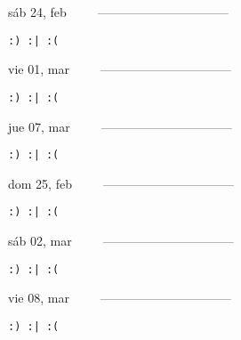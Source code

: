 \documentclass[letterpaper,10pt]{article}
\begin{document}
\begin{multicols}{3}
{sáb 24, feb\ \ \ \ \ --------------------------------}
\begin{flushright}\begin{small}\texttt{:) :| :(}\end{small}\end{flushright}
\vfill
{vie 01, mar\ \ \ \ \ --------------------------------}
\begin{flushright}\begin{small}\texttt{:) :| :(}\end{small}\end{flushright}\par
\vfill
{jue 07, mar\ \ \ \ \ --------------------------------}
\begin{flushright}\begin{small}\texttt{:) :| :(}\end{small}\end{flushright}\par
\vfill
\end{multicols}
\vspace{1.05cm}

\begin{multicols}{3}
{dom 25, feb\ \ \ \ \ --------------------------------}
\begin{flushright}\begin{small}\texttt{:) :| :(}\end{small}\end{flushright}
\vfill
{sáb 02, mar\ \ \ \ \ --------------------------------}
\begin{flushright}\begin{small}\texttt{:) :| :(}\end{small}\end{flushright}\par
\vfill
{vie 08, mar\ \ \ \ \ --------------------------------}
\begin{flushright}\begin{small}\texttt{:) :| :(}\end{small}\end{flushright}\par
\vfill
\end{multicols}
\vspace{1.05cm}
\end{document}

